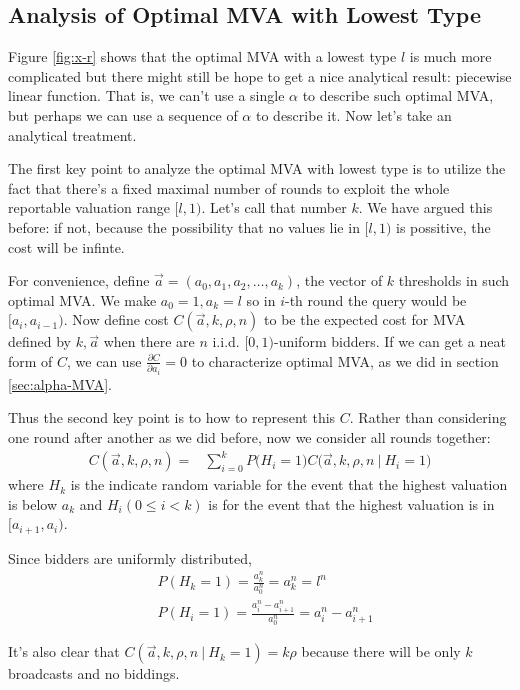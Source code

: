 \subsection{Analysis of Optimal MVA with Lowest Type}

Figure \ref{fig:x-r} shows that the optimal MVA with a lowest type $l$ is
much more complicated but there might still be hope to get a nice analytical
result: piecewise linear function. That is, we can't use a single $\alpha$ to
describe such optimal MVA, but perhaps we can use a sequence of $\alpha$ to
describe it. Now let's take an analytical treatment.

The first key point to analyze the optimal MVA with lowest type is to utilize
the fact that there's a fixed maximal number
of rounds to exploit the whole reportable valuation range $[l, 1)$. Let's call
that number $k$. We have argued this before: if not, because the possibility that
no values lie in $[l, 1)$ is possitive, the cost will be infinte.

For convenience, define $\vec a = (a_0, a_1, a_2, \ldots, a_k)$, the vector of
$k$ thresholds in such optimal MVA. We make $a_0 = 1, a_k = l$ so in $i$-th round
the query would be $[a_i, a_{i-1})$. Now define cost $C(\vec a, k, \rho, n)$ to
be the expected cost for MVA defined by $k, \vec a$ when there are $n$ i.i.d.
$[0, 1)$-uniform bidders. If we can get a neat form of $C$, we can use
$\frac{\partial C}{\partial a_i} = 0 $ to characterize optimal MVA, as we did
in section \ref{sec:alpha-MVA}.

Thus the second key point is to how to represent this $C$. Rather than
considering one round after another as we did before, now we consider all
rounds together:
\begin{align*}
C(\vec a, k, \rho, n) =
&\sum_{i=0}^k P\big(H_i = 1\big) C\big(\vec a, k, \rho, n ~\big|~ H_i = 1 \big)
\end{align*}
where $H_k$ is the indicate random variable for the event that the highest
valuation is below $a_k$ and $H_i(0 \leq i < k)$ is for the event that the highest
valuation is in $[a_{i+1}, a_i)$.

Since bidders are uniformly distributed,
\begin{align*}
  &P(H_k = 1) = \frac{a_k^n}{a_0^n} = a_k^n = l^n\\
    &P(H_i = 1) = \frac{a_{i}^n-a_{i+1}^n}{a_0^n} = a_{i}^n-a_{i+1}^n
\end{align*}

It's also clear that $C(\vec a, k, \rho, n ~\big|~ H_k = 1) = k\rho$ because
there will be only $k$ broadcasts and no biddings.

